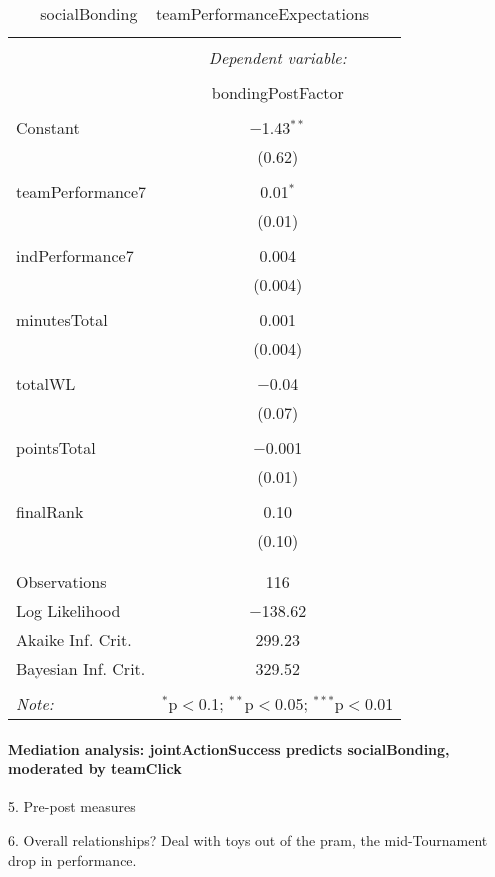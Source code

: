 \documentclass[12pt]{report}
\begin{document}
\begin{table}[!htbp] \centering
  \caption{socialBonding ~ teamPerformanceExpectations}
  \label{}
\begin{tabular}{@{\extracolsep{5pt}}lc}
\\[-1.8ex]\hline
\hline \\[-1.8ex]
 & \multicolumn{1}{c}{\textit{Dependent variable:}} \\
\cline{2-2}
\\[-1.8ex] & bondingPostFactor \\
\hline \\[-1.8ex]
 Constant & $-$1.43$^{**}$ \\
  & (0.62) \\
  & \\
 teamPerformance7 & 0.01$^{*}$ \\
  & (0.01) \\
  & \\
 indPerformance7 & 0.004 \\
  & (0.004) \\
  & \\
 minutesTotal & 0.001 \\
  & (0.004) \\
  & \\
 totalWL & $-$0.04 \\
  & (0.07) \\
  & \\
 pointsTotal & $-$0.001 \\
  & (0.01) \\
  & \\
 finalRank & 0.10 \\
  & (0.10) \\
  & \\
\hline \\[-1.8ex]
Observations & 116 \\
Log Likelihood & $-$138.62 \\
Akaike Inf. Crit. & 299.23 \\
Bayesian Inf. Crit. & 329.52 \\
\hline
\hline \\[-1.8ex]
\textit{Note:}  & \multicolumn{1}{r}{$^{*}$p$<$0.1; $^{**}$p$<$0.05; $^{***}$p$<$0.01} \\
\end{tabular}
\end{table}







\paragraph{Mediation analysis: jointActionSuccess predicts socialBonding, moderated by teamClick}














5. Pre-post measures

6.  Overall relationships? Deal with toys out of the pram, the mid-Tournament drop in performance.
\end{document}
